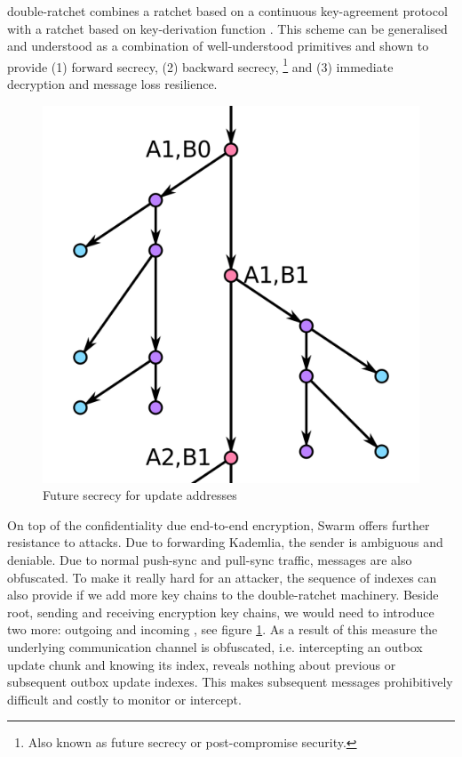 double-ratchet combines a ratchet based on a continuous key-agreement protocol with a ratchet based on key-derivation function \cite{perrin2016double}. This scheme can be generalised \cite{alwen2019double} and understood as a combination of well-understood primitives and shown to provide  (1) forward secrecy, (2) backward secrecy,%
%
\footnote{Also known as future secrecy or post-compromise security.}
%
and (3) immediate decryption and message loss resilience.


\begin{figure}[htbp]
\centering
\includegraphics[width=.6\textwidth]{fig/double-ratchet.png}
\caption[Future secrecy for update addresses \statusorange]{Future secrecy for update addresses}
\label{fig:double-ratchet-for-feeds}
\end{figure}

On top of the confidentiality due end-to-end encryption, Swarm offers further resistance to attacks. Due to forwarding Kademlia, the sender is ambiguous and deniable. Due to normal push-sync and pull-sync traffic, messages are also obfuscated. To make it really hard for an attacker, the sequence of indexes can also provide  if we add more key chains to the double-ratchet machinery. Beside root, sending and receiving encryption key chains, we would need to introduce two more: outgoing and incoming , see figure \ref{fig:double-ratchet-for-feeds}. As a result of this measure the underlying communication channel is obfuscated, i.e. intercepting an outbox update chunk and knowing its index, reveals nothing about previous or subsequent outbox update indexes. This makes subsequent messages prohibitively difficult and costly to monitor or intercept.

